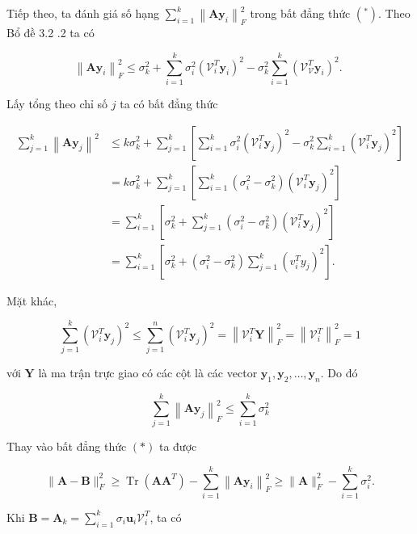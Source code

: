 \documentclass[12pt,a4paper,oneside]{report}
\numberwithin{equation}{section}
\begin{document}
Tiếp theo, ta đánh giá số hạng $\sum_{i=1}^{k}\left\|\mathbf{A y}_{i}\right\|_{F}^{2}$ trong bất đẳng thức $\left(^{*}\right)$. Theo Bổ đề 3.2 .2 ta có

$$
\left\|\mathbf{A y}_{i}\right\|_{F}^{2} \leqslant \sigma_{k}^{2}+\sum_{i=1}^{k} \sigma_{i}^{2}\left(\mathcal{V}_{i}^{T} \mathbf{y}_{i}\right)^{2}-\sigma_{k}^{2} \sum_{i=1}^{k}\left(\mathcal{V}_{\mathcal{V}}^{T} \mathbf{y}_{i}\right)^{2} \text {. }
$$

Lấy tổng theo chỉ số $j$ ta có bất đẳng thức

$$
\begin{aligned}
	\sum_{j=1}^{k}\left\|\mathbf{A y}_{j}\right\|^{2} & \leqslant k \sigma_{k}^{2}+\sum_{j=1}^{k}\left[\sum_{i=1}^{k} \sigma_{i}^{2}\left(\mathcal{V}_{i}^{T} \mathbf{y}_{j}\right)^{2}-\sigma_{k}^{2} \sum_{i=1}^{k}\left(\mathcal{V}_{i}^{T} \mathbf{y}_{j}\right)^{2}\right] \\
	& =k \sigma_{k}^{2}+\sum_{j=1}^{k}\left[\sum_{i=1}^{k}\left(\sigma_{i}^{2}-\sigma_{k}^{2}\right)\left(\mathcal{V}_{i}^{T} \mathbf{y}_{j}\right)^{2}\right] \\
	& =\sum_{i=1}^{k}\left[\sigma_{k}^{2}+\sum_{j=1}^{k}\left(\sigma_{i}^{2}-\sigma_{k}^{2}\right)\left(\mathcal{V}_{i}^{T} \mathbf{y}_{j}\right)^{2}\right] \\
	& =\sum_{i=1}^{k}\left[\sigma_{k}^{2}+\left(\sigma_{i}^{2}-\sigma_{k}^{2}\right) \sum_{j=1}^{k}\left(v_{i}^{T} y_{j}\right)^{2}\right] .
\end{aligned}
$$

Mặt khác,

$$
\sum_{j=1}^{k}\left(\mathcal{V}_{i}^{T} \mathbf{y}_{j}\right)^{2} \leqslant \sum_{j=1}^{n}\left(\mathcal{V}_{i}^{T} \mathbf{y}_{j}\right)^{2}=\left\|\mathcal{V}_{i}^{T} \mathbf{Y}\right\|_{F}^{2}=\left\|\mathcal{V}_{i}^{T}\right\|_{F}^{2}=1
$$

với $\mathbf{Y}$ là ma trận trực giao có các cột là các vector $\mathbf{y}_{1}, \mathbf{y}_{2}, \ldots, \mathbf{y}_{n}$. Do đó

$$
\sum_{j=1}^{k}\left\|\mathbf{A y}_{j}\right\|_{F}^{2} \leqslant \sum_{i=1}^{k} \sigma_{k}^{2}
$$

Thay vào bất đẳng thức $(*)$ ta được

$$
\|\mathbf{A}-\mathbf{B}\|_{F}^{2} \geqslant \operatorname{Tr}\left(\mathbf{A} \mathbf{A}^{T}\right)-\sum_{i=1}^{k}\left\|\mathbf{A} \mathbf{y}_{i}\right\|_{F}^{2} \geqslant\|\mathbf{A}\|_{F}^{2}-\sum_{i=1}^{k} \sigma_{i}^{2} .
$$

Khi $\mathbf{B}=\mathbf{A}_{k}=\sum_{i=1}^{k} \sigma_{i} \mathbf{u}_{i} \mathcal{V}_{i}^{T}$, ta có
\end{document}
